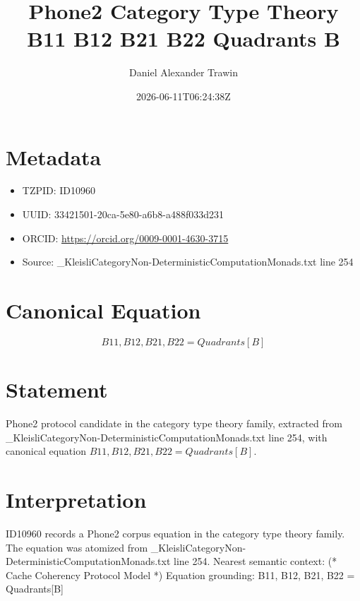 \documentclass[11pt]{article}
\title{Phone2 Category Type Theory B11 B12 B21 B22 Quadrants B}
\author{Daniel Alexander Trawin}
\date{2026-06-11T06:24:38Z}
\begin{document}
\maketitle
\section*{Metadata}
\begin{itemize}
\item TZPID: ID10960
\item UUID: 33421501-20ca-5e80-a6b8-a488f033d231
\item ORCID: \url{https://orcid.org/0009-0001-4630-3715}
\item Source: _KleisliCategoryNon-DeterministicComputationMonads.txt line 254
\end{itemize}
\section*{Canonical Equation}
\[
{B11, B12, B21, B22} = Quadrants[B]
\]
\section*{Statement}
Phone2 protocol candidate in the category type theory family, extracted from _KleisliCategoryNon-DeterministicComputationMonads.txt line 254, with canonical equation ${B11, B12, B21, B22} = Quadrants[B]$.
\section*{Interpretation}
ID10960 records a Phone2 corpus equation in the category type theory family. The equation was atomized from _KleisliCategoryNon-DeterministicComputationMonads.txt line 254. Nearest semantic context: (* Cache Coherency Protocol Model *) Equation grounding: {B11, B12, B21, B22} = Quadrants[B]
\end{document}
